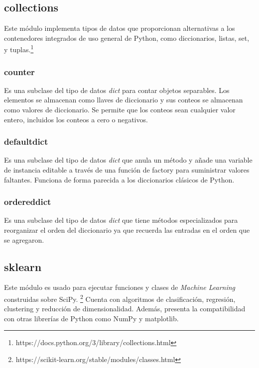 \documentclass[a4paper, 12pt]{book}
\begin{document}
\subsection{collections}
\label{sec:collections}

Este módulo implementa tipos de datos que proporcionan alternativas a los contenedores integrados de uso general de Python, como diccionarios, listas, set, y tuplas.\footnote{https://docs.python.org/3/library/collections.html}

\subsubsection{counter}
\label{sec:difflib_counter}

Es una subclase del tipo de datos \textit{dict} para contar objetos separables. Los elementos se almacenan como llaves de diccionario y sus conteos se almacenan como valores de diccionario. Se permite que los conteos sean cualquier valor entero, incluidos los conteos a cero o negativos.

\subsubsection{defaultdict}
\label{sec:difflib_defaultdict}

Es una subclase del tipo de datos \textit{dict} que anula un método y añade una variable de instancia editable a través de una función de factory para suministrar valores faltantes. Funciona de forma parecida a los diccionarios clásicos de Python.

\subsubsection{ordereddict}
\label{sec:difflib_ordereddict}

Es una subclase del tipo de datos \textit{dict} que tiene métodos especializados para reorganizar el orden del diccionario ya que recuerda las entradas en el orden que se agregaron.

\subsection{sklearn}
\label{sec:sklearn}

Este módulo es usado para ejecutar funciones y clases de \textit{Machine Learning} construidas sobre SciPy. \footnote{https://scikit-learn.org/stable/modules/classes.html} Cuenta con algoritmos de clasificación, regresión, clustering y reducción de dimensionalidad. Además, presenta la compatibilidad con otras librerías de Python como NumPy y matplotlib.
\end{document}
